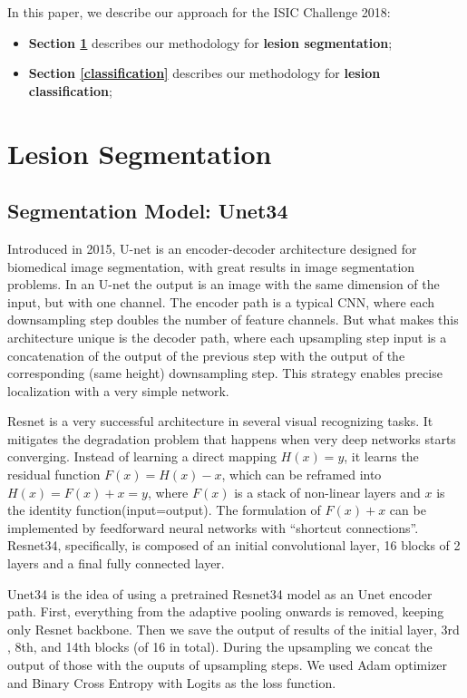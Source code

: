 \documentclass[conference]{IEEEtran}
\begin{document}
In this paper, we describe our approach for the ISIC Challenge 2018:
\begin{itemize}
\item \textbf{Section \ref{segmentation}} describes our methodology for \textbf{lesion segmentation};
\item \textbf{Section \ref{classification}} describes our methodology for \textbf{lesion classification};
\end{itemize}


\section{Lesion Segmentation}
\label{segmentation}


\subsection{Segmentation Model: Unet34}
Introduced in 2015, U-net is an encoder-decoder architecture designed for biomedical image segmentation\cite{olaf}, with great results in image segmentation problems\cite{iglovikov}. In an U-net the output is an image with the same dimension of the input, but with one channel.  The encoder path is a typical CNN, where each downsampling step doubles the number of feature channels. But what makes this architecture unique is the decoder path, where each upsampling step input is a concatenation of the output of the previous step with the output of the corresponding (same height) downsampling step. This strategy enables precise localization with a very simple network. 

Resnet is a very successful architecture in several visual recognizing tasks\cite{he}. It mitigates the degradation problem that happens when very deep networks starts converging. Instead of learning a direct mapping $H(x) = y$, it learns the residual function  $F(x) = H(x)-x$, which can be reframed into $H(x) = F(x)+x = y$, where $F(x)$ is a stack of non-linear layers and $x$ is the identity function(input=output). The formulation of $F(x)+x$ can be implemented by feedforward neural networks with “shortcut connections”. Resnet34, specifically, is composed of an initial convolutional layer, 16 blocks of 2 layers and a final fully connected layer.

Unet34 is the idea of using a pretrained Resnet34 model as an Unet encoder path\cite{fastai}. First, everything from the adaptive pooling onwards is removed, keeping only Resnet backbone. Then we save the output of results of the initial layer, 3rd , 8th, and 14th blocks (of 16 in total). During the upsampling we concat the output of those with the ouputs of upsampling steps. We used Adam optimizer and Binary Cross Entropy with Logits as the loss function.
\end{document}

